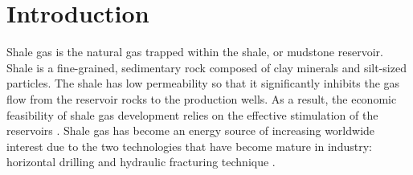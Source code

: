 \section{Introduction}





Shale gas is the natural gas trapped within the shale, or mudstone reservoir. %
Shale is a fine-grained, sedimentary rock composed of clay minerals and silt-sized particles. %
The shale has low permeability so that it significantly inhibits the gas flow from the reservoir rocks to the production wells. As a result, the economic feasibility of shale gas development relies on the effective stimulation of the reservoirs \cite{hattori2017numerical}.
Shale gas has become an energy source of increasing worldwide interest due to the two technologies that have become mature in industry: horizontal drilling and hydraulic fracturing technique \cite{middleton2014co2}.

